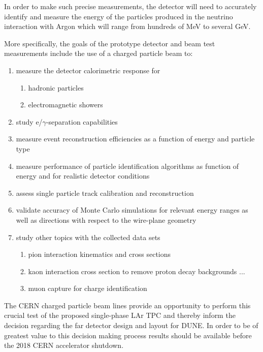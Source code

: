 In order to make such precise measurements, the detector will need to accurately identify and measure the energy of the particles produced in the neutrino interaction with Argon which will range from hundreds of MeV to several GeV.



More specifically, the goals of the prototype detector and beam test measurements include the use of a charged particle beam to:
\begin{enumerate}
\item measure the detector calorimetric response for
\begin{enumerate}
	\item hadronic particles
	\item electromagnetic showers
\end{enumerate}
\item study e/$\gamma$-separation capabilities
\item measure event reconstruction efficiencies as a function of energy and particle type
\item measure performance of particle identification algorithms as function of energy and for realistic detector conditions
\item assess single particle track calibration and reconstruction
\item validate accuracy of Monte Carlo simulations for relevant energy ranges as well as directions with respect to the wire-plane geometry

\item study other topics with the collected data sets
 \begin{enumerate}
    \item pion interaction kinematics and cross sections
    \item kaon interaction cross section to remove proton decay backgrounds ...
    \item muon capture for charge identification
 \end{enumerate}
\end{enumerate}

The CERN charged particle beam lines provide an opportunity to perform this crucial test of the 
proposed single-phase LAr TPC and thereby inform the decision regarding the far detector design and layout for DUNE.
In order to be of greatest value to this decision making process results should be available before the 2018 CERN accelerator shutdown.


